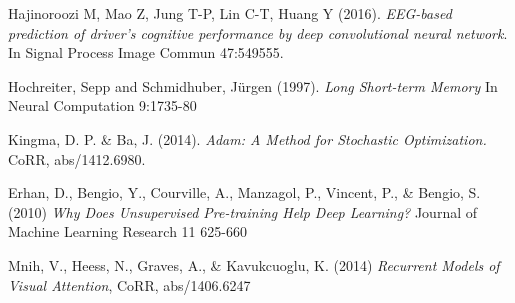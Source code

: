 \documentclass{article}
\begin{document}
\begin{thebibliography}{99}
	Hajinoroozi M, Mao Z, Jung T-P, Lin C-T, Huang Y (2016).
	\textit{EEG-based prediction of driver's cognitive performance by deep convolutional neural network}. 
	In Signal Process Image Commun 47:549555.
	
	Hochreiter, Sepp and Schmidhuber, Jürgen (1997).
	\textit{Long Short-term Memory}
	In Neural Computation 9:1735-80

	Kingma, D. P. \& Ba, J. (2014). 
	\textit{Adam: A Method for Stochastic Optimization.} 
	CoRR, abs/1412.6980. 
    
    Erhan, D., Bengio, Y., Courville, A., Manzagol, P., Vincent, P., \& Bengio, S. (2010) 
    \textit{Why Does Unsupervised Pre-training Help Deep Learning?}
    Journal of Machine Learning Research 11 625-660
    
    Mnih, V., Heess, N., Graves, A., \& Kavukcuoglu, K. (2014)
    \textit{Recurrent Models of Visual Attention},
    CoRR, abs/1406.6247
	
\end{thebibliography}
\end{document}
